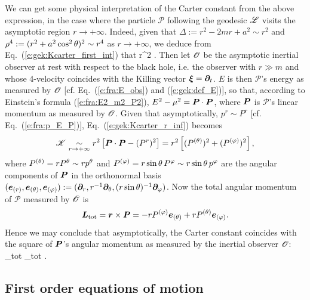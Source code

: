 We can get some physical interpretation of the Carter constant from the above
expression, in the case where the particle $\mathscr{P}$ following the
geodesic $\mathscr{L}$ visits the asymptotic region $r\to+\infty$. Indeed, given
that $\Delta := r^2 - 2m r + a^2 \sim r^2$  and $\rho^4 := (r^2 + a^2\cos^2\theta)^2 \sim r^4$
as $r\to+\infty$, we deduce from Eq.~(\ref{e:gek:Kcarter_first_int})
that
\be \label{e:gek:Kcarter_r_inf}
      r^2 \left[ E^2 - \mu^2 - (p^r)^2 \right] .
\ee
Then let $\mathscr{O}$ be the asymptotic inertial observer at rest with respect to the
black hole, i.e. the observer with $r\gg m$ and whose 4-velocity
coincides with the Killing vector
$\bm{\xi} = \bm{\partial}_t$. $E$ is then $\mathscr{P}$'s energy as measured by $\mathscr{O}$
[cf. Eq.~(\ref{e:fra:E_obs}) and (\ref{e:gek:def_E})], so that, according to
Einstein's formula (\ref{e:fra:E2_m2_P2}), $E^2 - \mu^2 = \bm{P}\cdot\bm{P}$, where
$\bm{P}$ is $\mathscr{P}$'s linear momentum as measured by $\mathscr{O}$. Given
that asymptotically, $p^r\sim P^r$ [cf. Eq.~(\ref{e:fra:p_E_P})],
Eq.~(\ref{e:gek:Kcarter_r_inf}) becomes
\[
    \mathscr{K} \underset{r\to + \infty}{\sim} r^2 \left[ \bm{P}\cdot\bm{P} - (P^r)^2 \right]
    = r^2 \left[ (P^{(\theta)})^2 + (P^{(\varphi)})^2 \right],
\]
where $P^{(\theta)} = r P^\theta \sim r p^\theta$ and $P^{(\varphi)} = r\sin\theta\, P^\varphi \sim r\sin\theta\, p^\varphi$
are the angular components of $\bm{P}$ in the
orthonormal basis $(\bm{e}_{(r)}, \bm{e}_{(\theta)}, \bm{e}_{(\varphi)}) := (\bm{\partial}_r, r^{-1} \bm{\partial}_\theta,
(r\sin\theta)^{-1}\bm{\partial}_\varphi)$.
Now the total angular momentum of $\mathscr{P}$ measured by $\mathscr{O}$ is
\[
    \bm{L}_{\rm tot} = \bm{r} \times \bm{P} = - r P^{(\varphi)} \bm{e}_{(\theta)}
        + r P^{(\theta)} \bm{e}_{(\varphi)} .
\]
Hence we may conclude that asymptotically, the Carter constant coincides with
the square of $\bm{P}$'s angular momentum as measured by the inertial observer $\mathscr{O}$:
\be \label{e:gek:Kcarter_asymptot}
      _{\rm tot} \cdot {}_{\rm tot} .
\ee

\subsection{First order equations of motion} \label{s:gek:first_order_system}

